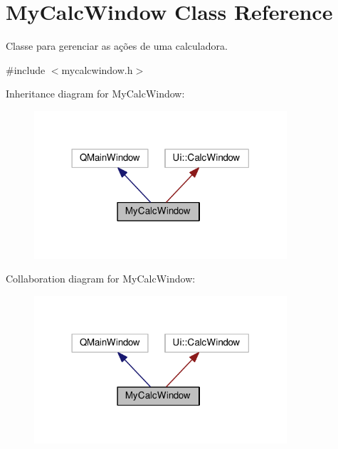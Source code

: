 \hypertarget{classMyCalcWindow}{}\section{My\+Calc\+Window Class Reference}
\label{classMyCalcWindow}


Classe para gerenciar as ações de uma calculadora.  




{\ttfamily \#include $<$mycalcwindow.\+h$>$}



Inheritance diagram for My\+Calc\+Window\+:\nopagebreak
\begin{figure}[H]
\begin{center}
\leavevmode
\includegraphics[width=266pt]{d9/d04/classMyCalcWindow__inherit__graph}
\end{center}
\end{figure}


Collaboration diagram for My\+Calc\+Window\+:\nopagebreak
\begin{figure}[H]
\begin{center}
\leavevmode
\includegraphics[width=266pt]{d6/dbc/classMyCalcWindow__coll__graph}
\end{center}
\end{figure}
